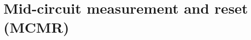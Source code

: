 \documentclass{beamer}
\begin{document}
\section{Mid-circuit measurement and reset (MCMR)}


\end{document}

